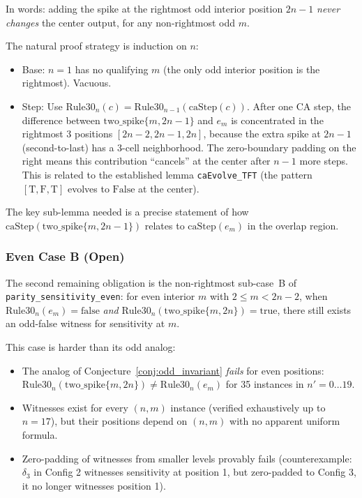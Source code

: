 \documentclass[11pt]{article}
\begin{document}
In words: adding the spike at the rightmost odd interior position $2n-1$ \emph{never changes} the center output, for any non-rightmost odd $m$.

The natural proof strategy is induction on $n$:
\begin{itemize}
    \item Base: $n=1$ has no qualifying $m$ (the only odd interior position is the rightmost). Vacuous.
    \item Step: Use $\mathrm{Rule30}_n(c) = \mathrm{Rule30}_{n-1}(\mathrm{caStep}(c))$. After one CA step, the difference between $\mathrm{two\_spike}\{m, 2n-1\}$ and $e_m$ is concentrated in the rightmost 3 positions $[2n-2, 2n-1, 2n]$, because the extra spike at $2n-1$ (second-to-last) has a 3-cell neighborhood. The zero-boundary padding on the right means this contribution ``cancels'' at the center after $n-1$ more steps. This is related to the established lemma \texttt{caEvolve\_TFT} (the pattern $[\mathrm{T},\mathrm{F},\mathrm{T}]$ evolves to $\mathrm{False}$ at the center).
\end{itemize}

The key sub-lemma needed is a precise statement of how $\mathrm{caStep}(\mathrm{two\_spike}\{m, 2n-1\})$ relates to $\mathrm{caStep}(e_m)$ in the overlap region.

\subsubsection{Even Case B (Open)}\label{sec:even_caseB}

The second remaining obligation is the non-rightmost sub-case~B of \texttt{parity\_sensitivity\_even}: for even interior $m$ with $2 \leq m < 2n-2$, when $\mathrm{Rule30}_n(e_m) = \mathrm{false}$ \emph{and} $\mathrm{Rule30}_n(\mathrm{two\_spike}\{m, 2n\}) = \mathrm{true}$, there still exists an odd-false witness for sensitivity at $m$.

This case is harder than its odd analog:
\begin{itemize}
    \item The analog of Conjecture~\ref{conj:odd_invariant} \emph{fails} for even positions: $\mathrm{Rule30}_n(\mathrm{two\_spike}\{m, 2n\}) \neq \mathrm{Rule30}_n(e_m)$ for 35 instances in $n' = 0\ldots 19$.
    \item Witnesses exist for every $(n, m)$ instance (verified exhaustively up to $n = 17$), but their positions depend on $(n, m)$ with no apparent uniform formula.
    \item Zero-padding of witnesses from smaller levels provably fails (counterexample: $\delta_3$ in Config 2 witnesses sensitivity at position 1, but zero-padded to Config 3, it no longer witnesses position 1).
\end{itemize}
\end{document}
